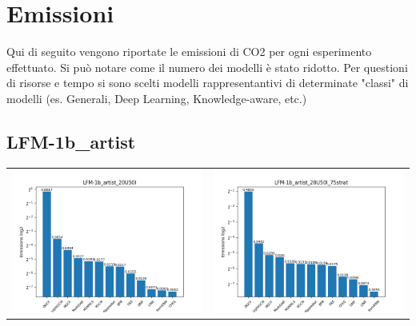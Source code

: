 \section{Emissioni}

Qui di seguito vengono riportate le emissioni di CO2 per ogni esperimento effettuato.
Si può notare come il numero dei modelli è stato ridotto. Per questioni di risorse e tempo si sono scelti modelli rappresentantivi di determinate "classi" di modelli (es. Generali, Deep Learning, Knowledge-aware, etc.) 


\subsection{LFM-1b\_artist}
\begin{table}[H]
    \centering
    \footnotesize
    \setlength\tabcolsep{0pt}
    \begin{tabularx}{\textwidth}{|X|X|}
        \hline
        \includegraphics[width=\linewidth, trim=0 0 0 0]{images/emissions_LFM-1b_artist_20U50I.png} &
        \includegraphics[width=\linewidth, trim=0 0 0 0]{images/emissions_LFM-1b_artist_20U50I_75strat.png} \\

\end{tabularx}
\end{table}

